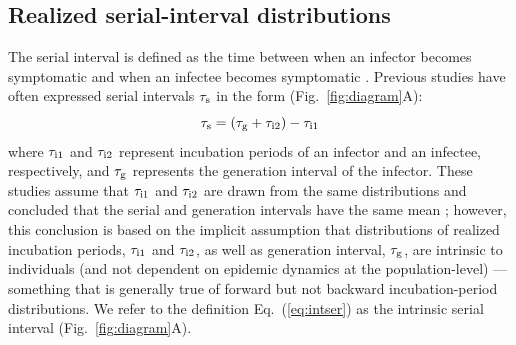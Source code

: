 \documentclass[12pt]{article}
\newcommand{\eref}[1]{Eq.~(\ref{eq:#1})}
\newcommand{\fref}[1]{Fig.~\ref{fig:#1}}
\newcommand{\gtime}{\tau_{\rm g}} %
\begin{document}
\subsection{Realized serial-interval distributions}

The serial interval is defined as the time between when an infector becomes symptomatic and when an infectee becomes symptomatic \citep{svensson2007note}.
Previous studies have often expressed serial intervals $\tau_{\rm s}$ in the form (\fref{diagram}A):
\begin{equation}
\tau_{\rm s} = (\gtime + \tau_{\rm i2}) - \tau_{\rm i1}
\label{eq:intser}
\end{equation}
where $\tau_{\rm i1}$ and $\tau_{\rm i2}$ represent incubation periods of an infector and
an infectee, respectively, and $\gtime$ represents the generation
interval of the infector.  
These studies assume that $\tau_{\rm i1}$ and $\tau_{\rm i2}$ are drawn from the same distributions and concluded that the serial and generation intervals have the same mean \citep{svensson2007note,klinkenberg2011correlation,champredon2018equivalence, britton2019estimation};
however, this conclusion is based on the implicit assumption that distributions of realized incubation periods, $\tau_{\rm i1}$ and $\tau_{\rm i2}$, as well as generation interval, $\gtime$, are intrinsic to individuals (and not dependent on epidemic dynamics at the population-level) ---
something that is generally true of forward but not backward incubation-period distributions.
We refer to the definition \eref{intser} as the intrinsic
serial interval (\fref{diagram}A).
\end{document}
